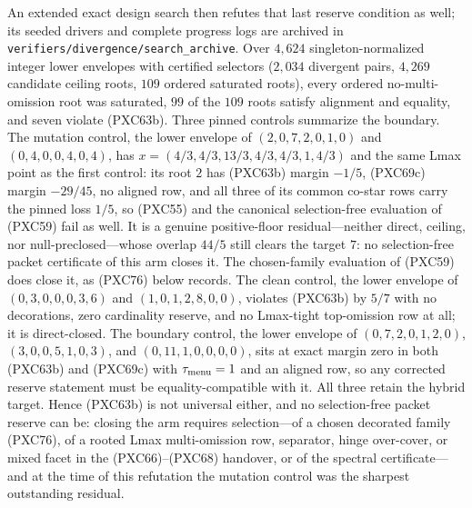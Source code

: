 \documentclass[11pt]{article}
\begin{document}
An extended exact design search then refutes that last reserve condition
as well; its seeded drivers and complete progress logs are archived in
\texttt{verifiers/divergence/search\_archive}.  Over $4{,}624$
singleton-normalized integer lower envelopes with certified selectors ($2{,}034$ divergent pairs, $4{,}269$ candidate
ceiling roots, $109$ ordered saturated roots), every ordered
no-multi-omission root was saturated, $99$ of the $109$ roots satisfy
alignment and equality, and seven violate (PXC63b).  Three pinned controls
summarize the boundary.  The mutation control, the lower envelope of
$(2,0,7,2,0,1,0)$ and $(0,4,0,0,4,0,4)$, has
$x=(4/3,4/3,13/3,4/3,4/3,1,4/3)$ and the same Lmax point as the first
control: its root $2$ has (PXC63b) margin $-1/5$, (PXC69c) margin
$-29/45$, no aligned row, and all three of its common co-star rows carry
the pinned loss $1/5$, so (PXC55) and the canonical selection-free
evaluation of (PXC59) fail as well.  It is a genuine positive-floor
residual---neither direct, ceiling, nor null-preclosed---whose overlap
$44/5$ still clears the target $7$: no selection-free packet certificate
of this arm closes it.  The chosen-family evaluation of (PXC59) does
close it, as (PXC76) below records.  The clean control, the
lower envelope of $(0,3,0,0,0,3,6)$ and $(1,0,1,2,8,0,0)$, violates
(PXC63b) by $5/7$ with no decorations, zero cardinality reserve, and no
Lmax-tight top-omission row at all; it is direct-closed.  The boundary
control, the lower envelope of $(0,7,2,0,1,2,0)$, $(3,0,0,5,1,0,3)$, and
$(0,11,1,0,0,0,0)$, sits at exact margin zero in both (PXC63b) and
(PXC69c) with $\tau_{\rm menu}=1$ and an aligned row, so any corrected
reserve statement must be equality-compatible with it.  All three retain
the hybrid target.  Hence (PXC63b) is not universal either, and no selection-free
packet reserve can be: closing the arm requires selection---of a chosen
decorated family (PXC76), of a rooted Lmax multi-omission row, separator,
hinge over-cover, or mixed facet in the (PXC66)--(PXC68) handover, or of
the spectral certificate---and at the time of this refutation the
mutation control was the sharpest outstanding residual.
\end{document}
